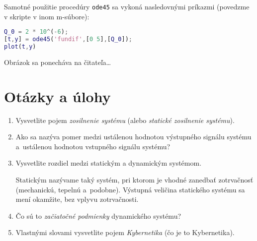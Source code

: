 \documentclass[a4paper, 10pt, ]{article}
\begin{document}
Samotné použitie procedúry \verb|ode45| sa vykoná nasledovnými príkazmi (povedzme v skripte v inom m-súbore):
\begin{lstlisting}[language=Matlab,]
Q_0 = 2 * 10^(-6);
[t,y] = ode45('fundif',[0 5],[Q_0]);
plot(t,y)
\end{lstlisting}
Obrázok sa ponecháva na čitateľa\ldots











\section{Otázky a úlohy}

\begin{enumerate}[leftmargin=0pt, labelsep=3mm, itemsep=0pt]

	\item Vysvetlite pojem \emph{zosilnenie systému} (alebo \emph{statické zosilnenie systému}).

    \item Ako sa nazýva pomer medzi ustálenou hodnotou výstupného signálu systému a~ustálenou hodnotou vstupného signálu systému? 
    	
    \item Vysvetlite rozdiel medzi statickým a dynamickým systémom.

    {\color{Gray} \scriptsize Statickým nazývame taký systém, pri ktorom je vhodné zanedbať zotrvačnosť (mechanickú, tepelnú a~podobne). Výstupná veličina statického systému sa mení okamžite, bez vplyvu zotrvačnosti.}
    
    \item Čo sú to \emph{začiatočné podmienky} dynamického systému?
    
    \item Vlastnými slovami vysvetlite pojem \emph{Kybernetika} (čo je to Kybernetika).

\end{enumerate}



\renewcommand{\refname}{Odporúčaná literatúra}

\nocite{AsM08se}
{}

\end{document}
